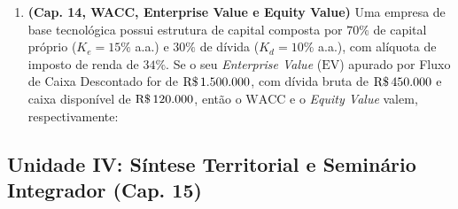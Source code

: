 \begin{enumerate}[leftmargin=1.5em, itemsep=5pt, resume]
  \item \textbf{(Cap. 14, WACC, Enterprise Value e Equity Value)} Uma empresa de base tecnológica possui estrutura de capital composta por $70\%$ de capital próprio ($K_e = 15\%$ a.a.) e $30\%$ de dívida ($K_d = 10\%$ a.a.), com alíquota de imposto de renda de $34\%$. Se o seu \textit{Enterprise Value} ($\text{EV}$) apurado por Fluxo de Caixa Descontado for de $\text{R\$\,}{1.500.000}$, com dívida bruta de $\text{R\$\,}{450.000}$ e caixa disponível de $\text{R\$\,}{120.000}$, então o $\text{WACC}$ e o \textit{Equity Value} valem, respectivamente:
\end{enumerate}

\subsection*{Unidade IV: Síntese Territorial e Seminário Integrador (Cap. 15)}

